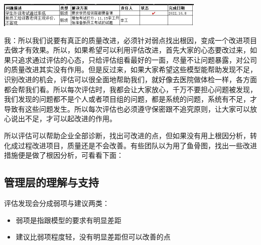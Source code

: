 \includegraphics[width=10cm]{IssuesScreenshot20221019205655.jpg}

我：所以我们说要有真正的质量改进，必须针对弱点找出根因，变成一个改进项目去做才有效果。所以，如果希望可以利用评估改进，首先大家的心态要改过来，如果只追求通过评估的心态，只给评估组看最好的一面，尽量不让问题暴露，对公司的质量改进其实没有作用。但是反过来，如果大家希望这些模型能帮助发现不足，识别改进的机会，评估可以很全面地帮助我们，就好像去医院做体检一样，各方面都会帮我们看。所以每次评估时，我都会让大家放心，千万不要担心问题被发现，我们发现的问题都不是个人或者项目组的问题，都是系统的问题，系统有不足，才导致有这些问题发生。所以每次评估也必须遵守保密跟不追究原则，让大家可以放心说出不足，才可以起改进的作用。

所以评估可以帮助企业全部诊断，找出可改进的点，但如果没有用上根因分析，转化成过程改进项目，质量还是不会改善。有些团队以为用了鱼骨图，找出一些改进措施便是做了根因分析，可看看下面：



\hypertarget{ux7ba1ux7406ux5c42ux7684ux7406ux89e3ux4e0eux652fux6301}{%
\subsection{管理层的理解与支持}\label{ux7ba1ux7406ux5c42ux7684ux7406ux89e3ux4e0eux652fux6301}}

评估发现会分成弱项与建议两类：

\begin{itemize}
\tightlist
\item
  弱项是指跟模型的要求有明显差距
\item
  建议比弱项程度轻，没有明显差距但可以改善的点\\
\end{itemize}

